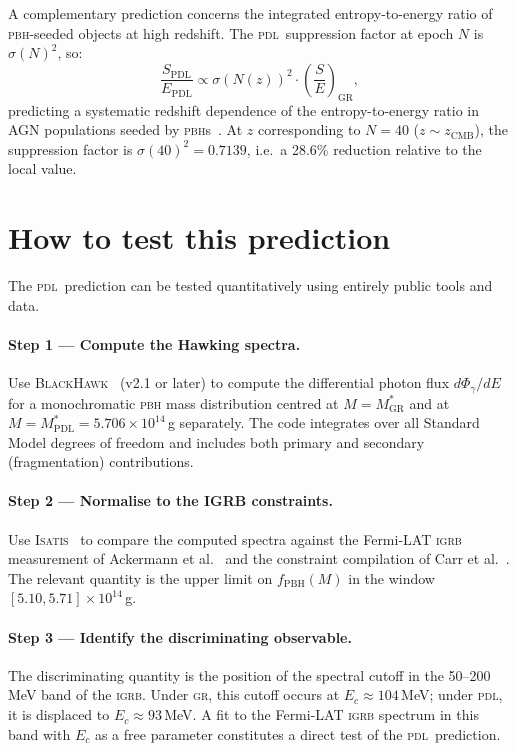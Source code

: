 \documentclass[12pt, a4paper]{article}
\theoremstyle{definition}
\newcommand{\PDL}{\textsc{pdl}}
\newcommand{\MstarGR}{M^{*}_{\mathrm{GR}}}
\newcommand{\MstarPDL}{M^{*}_{\mathrm{PDL}}}
\begin{document}
A complementary prediction concerns the integrated entropy-to-energy ratio of \textsc{pbh}-seeded objects at high redshift. The \PDL\ suppression factor at epoch $N$ is $\sigma(N)^2$, so:
\begin{equation}
  \frac{S_{\mathrm{PDL}}}{E_{\mathrm{PDL}}} \propto \sigma(N(z))^2 \cdot \left(\frac{S}{E}\right)_{\mathrm{GR}},
\end{equation}
predicting a systematic redshift dependence of the entropy-to-energy ratio in AGN populations seeded by \textsc{pbh}s~\cite{D38}. At $z$ corresponding to $N = 40$ ($z \sim z_{\mathrm{CMB}}$), the suppression factor is $\sigma(40)^2 = 0.7139$, i.e.\ a 28.6\% reduction relative to the local value.

\section{How to test this prediction}

The \PDL\ prediction can be tested quantitatively using entirely public tools and data.

\paragraph{Step 1 — Compute the Hawking spectra.} Use \textsc{BlackHawk}~\cite{BlackHawk} (v2.1 or later) to compute the differential photon flux $d\Phi_\gamma/dE$ for a monochromatic \textsc{pbh} mass distribution centred at $M = \MstarGR$ and at $M = \MstarPDL = 5.706\times10^{14}$\,g separately. The code integrates over all Standard Model degrees of freedom and includes both primary and secondary (fragmentation) contributions.

\paragraph{Step 2 — Normalise to the IGRB constraints.} Use \textsc{Isatis}~\cite{Isatis} to compare the computed spectra against the Fermi-LAT \textsc{igrb} measurement of Ackermann et al.~\cite{FermiIGRB2015} and the constraint compilation of Carr et al.~\cite{Carr2021}. The relevant quantity is the upper limit on $f_{\mathrm{PBH}}(M)$ in the window $[5.10, 5.71]\times10^{14}$\,g.

\paragraph{Step 3 — Identify the discriminating observable.} The discriminating quantity is the position of the spectral cutoff in the 50--200\,MeV band of the \textsc{igrb}. Under \textsc{gr}, this cutoff occurs at $E_c \approx 104$\,MeV; under \PDL, it is displaced to $E_c \approx 93$\,MeV. A fit to the Fermi-LAT \textsc{igrb} spectrum in this band with $E_c$ as a free parameter constitutes a direct test of the \PDL\ prediction.
\end{document}
